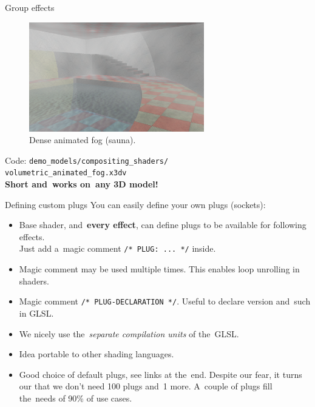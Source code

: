 \documentclass{beamer}
\begin{document}
\begin{frame}{Group effects}

\begin{figure}
  \centering
  \includegraphics[width=3in]{../volumetric_animated_fog_all}
  \caption{Dense animated fog (sauna).}
\end{figure}

Code: \texttt{demo\_models/compositing\_shaders/\\volumetric\_animated\_fog.x3dv}\\
\textbf{Short and~works on~any 3D model!}


\end{frame}

\begin{frame}{Defining custom plugs}
You can easily define your own plugs (sockets):
\begin{itemize}
  \item Base shader, and~\textbf{every effect}, can define plugs
    to be available for following effects.\\
    Just add a~magic comment \texttt{/* PLUG: ... */} inside.
  \item Magic comment may be used multiple times. This enables loop
    unrolling in shaders.
  \item Magic comment \texttt{/* PLUG-DECLARATION */}.
    Useful to declare version and~such in GLSL.
  \item We nicely use the~\textit{separate compilation units} of the~GLSL.
  \item Idea portable to other shading languages.
  \item Good choice of default plugs, see links at the~end.
    Despite our fear, it turns our that we don't need 100 plugs
    and~1 more. A~couple of plugs fill the~needs of 90\% of use cases.
\end{itemize}
\end{frame}
\end{document}
